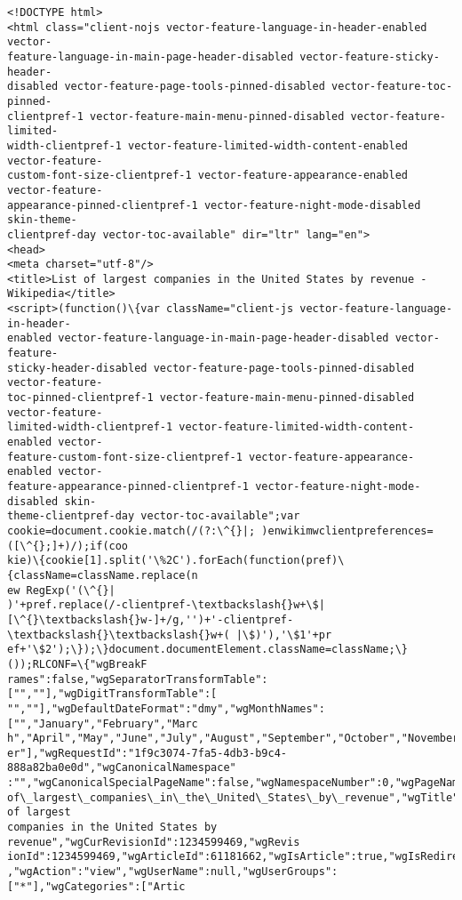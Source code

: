 \documentclass[11pt]{article}
\begin{document}
    \begin{Verbatim}[commandchars=\\\{\}]
<!DOCTYPE html>
<html class="client-nojs vector-feature-language-in-header-enabled vector-
feature-language-in-main-page-header-disabled vector-feature-sticky-header-
disabled vector-feature-page-tools-pinned-disabled vector-feature-toc-pinned-
clientpref-1 vector-feature-main-menu-pinned-disabled vector-feature-limited-
width-clientpref-1 vector-feature-limited-width-content-enabled vector-feature-
custom-font-size-clientpref-1 vector-feature-appearance-enabled vector-feature-
appearance-pinned-clientpref-1 vector-feature-night-mode-disabled skin-theme-
clientpref-day vector-toc-available" dir="ltr" lang="en">
<head>
<meta charset="utf-8"/>
<title>List of largest companies in the United States by revenue -
Wikipedia</title>
<script>(function()\{var className="client-js vector-feature-language-in-header-
enabled vector-feature-language-in-main-page-header-disabled vector-feature-
sticky-header-disabled vector-feature-page-tools-pinned-disabled vector-feature-
toc-pinned-clientpref-1 vector-feature-main-menu-pinned-disabled vector-feature-
limited-width-clientpref-1 vector-feature-limited-width-content-enabled vector-
feature-custom-font-size-clientpref-1 vector-feature-appearance-enabled vector-
feature-appearance-pinned-clientpref-1 vector-feature-night-mode-disabled skin-
theme-clientpref-day vector-toc-available";var
cookie=document.cookie.match(/(?:\^{}|; )enwikimwclientpreferences=([\^{};]+)/);if(coo
kie)\{cookie[1].split('\%2C').forEach(function(pref)\{className=className.replace(n
ew RegExp('(\^{}|
)'+pref.replace(/-clientpref-\textbackslash{}w+\$|[\^{}\textbackslash{}w-]+/g,'')+'-clientpref-\textbackslash{}\textbackslash{}w+( |\$)'),'\$1'+pr
ef+'\$2');\});\}document.documentElement.className=className;\}());RLCONF=\{"wgBreakF
rames":false,"wgSeparatorTransformTable":["",""],"wgDigitTransformTable":[
"",""],"wgDefaultDateFormat":"dmy","wgMonthNames":["","January","February","Marc
h","April","May","June","July","August","September","October","November","Decemb
er"],"wgRequestId":"1f9c3074-7fa5-4db3-b9c4-888a82ba0e0d","wgCanonicalNamespace"
:"","wgCanonicalSpecialPageName":false,"wgNamespaceNumber":0,"wgPageName":"List\_
of\_largest\_companies\_in\_the\_United\_States\_by\_revenue","wgTitle":"List of largest
companies in the United States by revenue","wgCurRevisionId":1234599469,"wgRevis
ionId":1234599469,"wgArticleId":61181662,"wgIsArticle":true,"wgIsRedirect":false
,"wgAction":"view","wgUserName":null,"wgUserGroups":["*"],"wgCategories":["Artic

\end{Verbatim}
\end{document}
